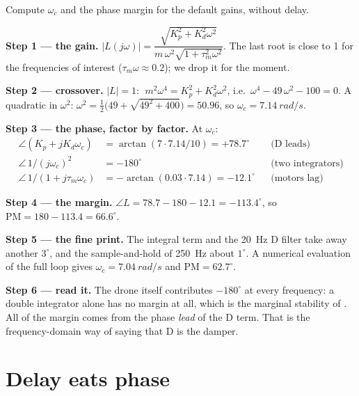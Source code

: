 \begin{example}
\label{ex:slow-pm}
Compute $\omega_c$ and the phase margin for the default gains, without delay.

\textbf{Step 1 — the gain.} $|L(j\omega)| = \dfrac{\sqrt{K_p^2 + K_d^2\omega^2}}{m\,\omega^2\sqrt{1 + \tau_m^2\omega^2}}$. The last root is close to 1 for the frequencies of interest ($\tau_m\omega \approx 0.2$); we drop it for the moment.

\textbf{Step 2 — crossover.} $|L| = 1$: $\;m^2\omega^4 = K_p^2 + K_d^2\omega^2$, i.e.\ $\omega^4 - 49\,\omega^2 - 100 = 0$. A quadratic in $\omega^2$: $\omega^2 = \tfrac12\big(49 + \sqrt{49^2 + 400}\big) = 50.96$, so $\omega_c = \SI{7.14}{rad/s}$.

\textbf{Step 3 — the phase, factor by factor.} At $\omega_c$:
\begin{align*}
  \angle(K_p + jK_d\omega_c) &= \arctan(7 \cdot 7.14/10) = +78.7^\circ &&\text{(D leads)}\\
  \angle\,1/(j\omega_c)^2 &= -180^\circ &&\text{(two integrators)}\\
  \angle\,1/(1 + j\tau_m\omega_c) &= -\arctan(0.03 \cdot 7.14) = -12.1^\circ &&\text{(motors lag)}
\end{align*}

\textbf{Step 4 — the margin.} $\angle L = 78.7 - 180 - 12.1 = -113.4^\circ$, so $\mathrm{PM} = 180 - 113.4 = 66.6^\circ$.

\textbf{Step 5 — the fine print.} The integral term and the \SI{20}{Hz} D filter take away another $3^\circ$, and the sample-and-hold of \SI{250}{Hz} about $1^\circ$. A numerical evaluation of the full loop gives $\omega_c = \SI{7.04}{rad/s}$ and $\mathrm{PM} = 62.7^\circ$.

\textbf{Step 6 — read it.} The drone itself contributes $-180^\circ$ at every frequency: a double integrator alone has no margin at all, which is the marginal stability of . All of the margin comes from the phase \emph{lead} of the D term. That is the frequency-domain way of saying that D is the damper.
\end{example}

\section{Delay eats phase}

